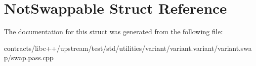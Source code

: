 \hypertarget{struct_not_swappable}{}\section{Not\+Swappable Struct Reference}
\label{struct_not_swappable}


The documentation for this struct was generated from the following file\+:\begin{DoxyCompactItemize}
\item 
contracts/libc++/upstream/test/std/utilities/variant/variant.\+variant/variant.\+swap/swap.\+pass.\+cpp\end{DoxyCompactItemize}

